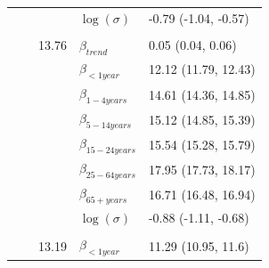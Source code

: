 \documentclass[a4paper,twoside,11pt]{report} %
\theoremstyle{definition}
\theoremstyle{definition}
\theoremstyle{definition}
\theoremstyle{definition}
\theoremstyle{remark}
\begin{document}
\begin{longtable}[t]{llrll}
\hspace{1em}\hspace{1em} &  &  & $\log(\sigma)$ & -0.79 (-1.04, -0.57)\\
\cmidrule{2-5}
\addlinespace[0.3em]
\multicolumn{5}{l}{\begin{math}\log(\lambda_{it})=\beta(ageGroup_{i})+\beta_{trend} t +\log(n_{it})\end{math}}\\
\hspace{1em}\hspace{1em} &  & 13.76 & $\beta_{trend}$ & 0.05 (0.04, 0.06)\\

\hspace{1em}\hspace{1em} &  &  & $\beta_{<1 year}$ & 12.12 (11.79, 12.43)\\

\hspace{1em}\hspace{1em} &  &  & $\beta_{1-4 years}$ & 14.61 (14.36, 14.85)\\

\hspace{1em}\hspace{1em} &  &  & $\beta_{5-14 years}$ & 15.12 (14.85, 15.39)\\

\hspace{1em}\hspace{1em} &  &  & $\beta_{15-24 years}$ & 15.54 (15.28, 15.79)\\

\hspace{1em}\hspace{1em} &  &  & $\beta_{25-64 years}$ & 17.95 (17.73, 18.17)\\

\hspace{1em}\hspace{1em} &  &  & $\beta_{65+ years}$ & 16.71 (16.48, 16.94)\\

\hspace{1em}\hspace{1em} &  &  & $\log(\sigma)$ & -0.88 (-1.11, -0.68)\\
\cmidrule{2-5}
\addlinespace[0.3em]
\multicolumn{5}{l}{\begin{math}\log(\lambda_{it})=\beta(ageGroup_{i})+\beta_{\sin}\sin\Big(\frac{\pi\cdot \tau_{t}}{6}\Big) + \beta_{\cos} \cos\Big(\frac{\pi \cdot \tau_{t}}{6}\Big)+\log(n_{it})\end{math}}\\
\hspace{1em}\hspace{1em} &  & 13.19 & $\beta_{<1 year}$ & 11.29 (10.95, 11.6)\\


\end{longtable}
\end{document}
